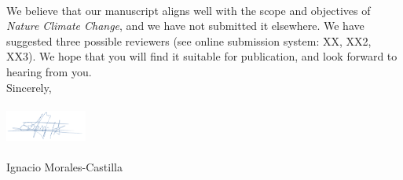 \documentclass[11pt,a4paper]{letter}
\begin{document}
\begin{letter}{}
\vspace{1.5ex}\\
We believe that our manuscript aligns well with the scope and objectives of \emph{Nature Climate Change}, and we have not submitted it elsewhere. We have suggested three possible reviewers (see online submission system: XX, XX2, XX3). We hope that you will find it suitable for publication, and look forward to hearing from you.
\vspace{1.5ex}\\
\noindent Sincerely,\\
\vspace{1.5ex}\\
 \includegraphics[width=0.2\textwidth]{Signature_IMC.png} \\
 \vspace{1.5ex}\\
\noindent Ignacio Morales-Castilla


\end{letter}
\end{document}
